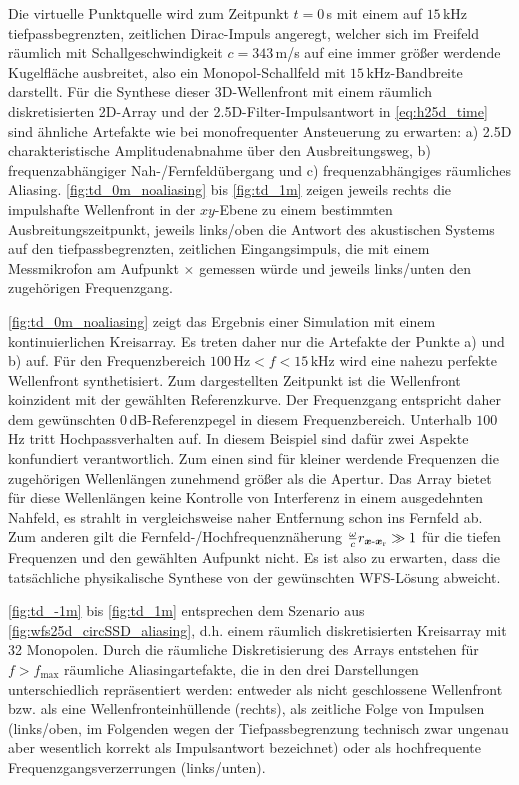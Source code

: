 %
Die virtuelle Punktquelle wird zum Zeitpunkt
$t=0$\,s mit einem auf $15$\,kHz tiefpassbegrenzten, zeitlichen Dirac-Impuls angeregt,
welcher sich im Freifeld räumlich mit Schallgeschwindigkeit $c=343$\,m/s
auf eine immer größer werdende Kugelfläche ausbreitet, also ein Monopol-Schallfeld mit
$15$\,kHz-Bandbreite darstellt.
%
Für die Synthese dieser 3D-Wellenfront mit einem räumlich diskretisierten 2D-Array
und der 2.5D-Filter-Impulsantwort in \Glg\eqref{eq:h25d_time}
sind ähnliche Artefakte wie bei monofrequenter Ansteuerung zu erwarten:
a) 2.5D charakteristische Amplitudenabnahme
über den Ausbreitungsweg,
b) frequenzabhängiger Nah-/Fernfeldübergang und
c) frequenzabhängiges räumliches Aliasing.
%
\Abb\ref{fig:td_0m_noaliasing} bis \ref{fig:td_1m} zeigen
jeweils rechts die impulshafte Wellenfront in der $xy$-Ebene zu einem
bestimmten Ausbreitungszeitpunkt,
jeweils links/oben die Antwort des akustischen Systems auf den tiefpassbegrenzten,
zeitlichen Eingangsimpuls, die mit einem Messmikrofon am Aufpunkt $\times$ gemessen
würde und
jeweils links/unten den zugehörigen Frequenzgang.
%



\Abb\ref{fig:td_0m_noaliasing} zeigt das Ergebnis einer Simulation mit einem
kontinuierlichen Kreisarray.
%
Es treten daher nur die Artefakte der Punkte a) und b) auf.
%
Für den Frequenzbereich $100\,\text{Hz} < f < 15\,\text{kHz}$
wird eine nahezu perfekte Wellenfront synthetisiert.
%
Zum dargestellten Zeitpunkt ist die Wellenfront koinzident mit der gewählten
Referenzkurve.
%
Der Frequenzgang entspricht daher dem gewünschten $0$\,dB-Referenzpegel in diesem
Frequenzbereich.
%
Unterhalb $100$\,Hz tritt Hochpassverhalten auf.
%
In diesem Beispiel sind dafür zwei Aspekte konfundiert verantwortlich.
%
Zum einen sind für kleiner werdende Frequenzen
die zugehörigen Wellenlängen zunehmend größer als die Apertur.
%
Das Array bietet für diese Wellenlängen keine Kontrolle von Interferenz
in einem ausgedehnten Nahfeld, es strahlt in vergleichsweise naher Entfernung
schon ins Fernfeld ab.
%
Zum anderen gilt die Fernfeld-/Hochfrequenznäherung $\frac{\omega}{c} r_{\bm{x}\text{-}\bm{x}_\mathrm{r}} \gg 1$
für die tiefen Frequenzen und den gewählten Aufpunkt nicht.
%
Es ist also zu erwarten, dass die tatsächliche physikalische Synthese von der
gewünschten WFS-Lösung abweicht.



\Abb\ref{fig:td_-1m} bis \ref{fig:td_1m} entsprechen dem Szenario aus
\Abb\ref{fig:wfs25d_circSSD_aliasing}, d.h. einem räumlich diskretisierten
Kreisarray mit 32 Monopolen.
%
Durch die räumliche Diskretisierung des Arrays entstehen für $f>f_\text{max}$
räumliche Aliasingartefakte, die in den drei Darstellungen unterschiedlich
repräsentiert werden: entweder als nicht geschlossene Wellenfront bzw.
als eine Wellenfronteinhüllende (rechts),
als zeitliche Folge von Impulsen (links/oben, im Folgenden wegen der
Tiefpassbegrenzung technisch zwar ungenau aber wesentlich korrekt als
Impulsantwort bezeichnet) oder als hochfrequente Frequenzgangsverzerrungen
(links/unten).



